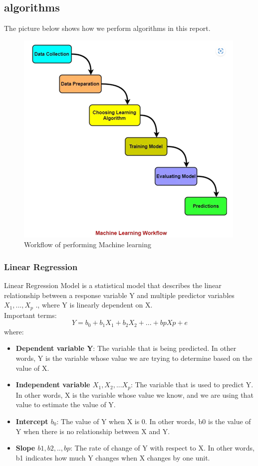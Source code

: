 \documentclass{ieeeojies}
\begin{document}
\subsection{algorithms}
\hspace{1em}The picture below shows how we perform algorithms in this report.
\begin{figure}[H]
    \centering
    \includegraphics[width=0.75\linewidth]{workflow.png}
    \caption{Workflow of performing Machine learning}
    \label{fig:enter-label}
\end{figure}
\subsubsection{\textbf{Linear Regression}}
\hspace{1em}Linear Regression Model is a statistical model that describes the linear relationship between a response variable Y and multiple predictor variables $X_1,..., X_p$ ., where Y is linearly dependent on X.\cite{a9}
\\Important terms:
\[Y = b_0 + b_1 X_1 + b_2 X_2 + ... + bp Xp + e\]
where:
\begin{itemize}
    \item \textbf{Dependent variable Y}: The variable that is being predicted. In other words, Y is the variable whose value we are trying to determine based on the value of X.
    \item \textbf{Independent variable $X_1,X_2,...X_p$}: The variable that is used to predict Y. In other words, X is the variable whose value we know, and we are using that value to estimate the value of Y.
    \item \textbf{Intercept $b_0$}: The value of Y when X is 0. In other words, b0 is the value of Y when there is no relationship between X and Y.
    \item \textbf{Slope $b1,b2,..,bp$}: The rate of change of Y with respect to X. In other words, b1 indicates how much Y changes when X changes by one unit.
\end{itemize}
\end{document}
